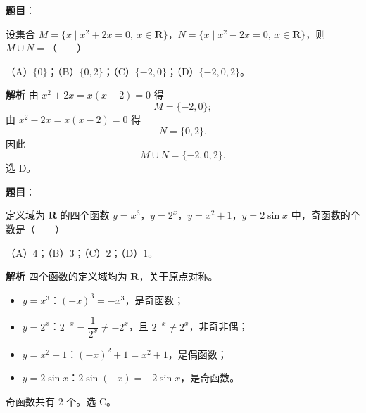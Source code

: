 

\begin{answer}

\textbf{题目}：

设集合 $M=\{x\mid x^2+2x=0,\ x\in\mathbf R\}$，$N=\{x\mid x^2-2x=0,\ x\in\mathbf R\}$，则 $M\cup N=$\mbox{（　　）}

（A）$\{0\}$；（B）$\{0,2\}$；（C）$\{-2,0\}$；（D）$\{-2,0,2\}$。

\textbf{解析}
由 $x^2+2x=x(x+2)=0$ 得
\nopagebreak[4]
\[M=\{-2,0\};\]
由 $x^2-2x=x(x-2)=0$ 得
\nopagebreak[4]
\[N=\{0,2\}.\]
因此
\nopagebreak[4]
\[M\cup N=\{-2,0,2\}.\]
选 D。


\end{answer}
\begin{answer}

\textbf{题目}：

定义域为 $\mathbf R$ 的四个函数 $y=x^3$，$y=2^x$，$y=x^2+1$，$y=2\sin x$ 中，奇函数的个数是\mbox{（　　）}

（A）$4$；（B）$3$；（C）$2$；（D）$1$。

\textbf{解析}
四个函数的定义域均为 $\mathbf R$，关于原点对称。

\begin{itemize}
\item $y=x^3$：$(-x)^3=-x^3$，是奇函数；
\item $y=2^x$：$2^{-x}=\dfrac1{2^x}\neq -2^x$，且 $2^{-x}\neq 2^x$，非奇非偶；
\item $y=x^2+1$：$(-x)^2+1=x^2+1$，是偶函数；
\item $y=2\sin x$：$2\sin(-x)=-2\sin x$，是奇函数。
\end{itemize}

奇函数共有 $2$ 个。选 C。


\end{answer}
